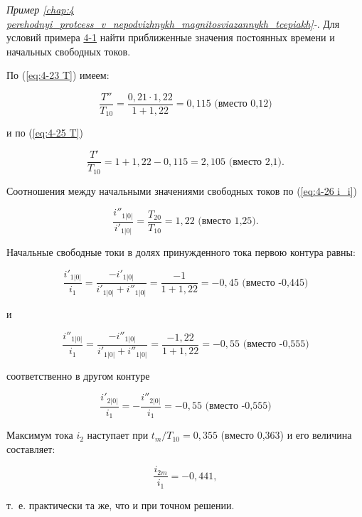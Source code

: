 \begin{small} %

\vspace{1pc}  %
	\textit{Пример \ref*{chap:4 perehodnyi_protcess_v_nepodvizhnykh_magnitosviazannykh_tcepiakh}-}. Для условий примера \hyperref[ex:4-1]{4-1} найти приближенные значения постоянных времени и начальных свободных токов.
	
	По (\ref{eq:4-23 T}) имеем:	
	
	\begin{equation*}    
        \frac{T''}{T_{10}}=\frac{0,21 \cdot 1,22}{1+1,22}=0,115 \text{~(вместо 0,12)}
    \end{equation*}
    
    и по (\ref{eq:4-25 T})
	
	\begin{equation*}    
        \frac{T'}{T_{10}}=1+1,22-0,115=2,105 \text{~(вместо 2,1).}
    \end{equation*}
	
	Соотношения между начальными значениями свободных токов по (\ref{eq:4-26 i_i})
	
	\begin{equation*}
        \frac{i''_{1|0|}}{i'_{1|0|}}=\frac{T_{20}}{T_{10}}=1,22 \text{~(вместо 1,25).}
    \end{equation*}
    
    Начальные свободные токи в долях принужденного тока первою контура равны:
    
    \begin{equation*}
        \frac{i'_{1|0|}}{i_1}=\frac{-i'_{1|0|}}{i'_{1|0|}+i''_{1|0|}}=\frac{-1}{1+1,22}=-0,45 \text{~(вместо -0,445)}
    \end{equation*}
    
    и
    
    \begin{equation*}
        \frac{i''_{1|0|}}{i_1}=\frac{-i''_{1|0|}}{i'_{1|0|}+i''_{1|0|}}=\frac{-1,22}{1+1,22}=-0,55 \text{~(вместо -0,555)}
    \end{equation*}
    
    соответственно в другом контуре
    
    \begin{equation*}
        \frac{i'_{2|0|}}{i_1}=-\frac{i''_{2|0|}}{i_1}=-0,55 \text{~(вместо -0,555)}
    \end{equation*}
    
    Максимум тока $ i_2 $ наступает при $ t_m / T_{10} = 0,355 $ (вместо 0,363) и его величина составляет:
    
    \begin{equation*}
        \frac{i_{2m}}{i_1}=-0,441,
    \end{equation*}
    
    т.~е. практически та же, что и при точном решении.
	
\vspace{1pc}		
	
\end{small}

